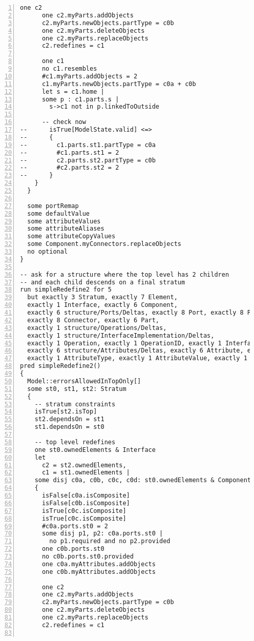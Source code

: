 \begin{lstlisting}[caption={unittests\_redefinition.als}, numbers=left]
      one c2
      one c2.myParts.addObjects
      c2.myParts.newObjects.partType = c0b
      one c2.myParts.deleteObjects
      one c2.myParts.replaceObjects
      c2.redefines = c1
      
      one c1
      no c1.resembles
      #c1.myParts.addObjects = 2
      c1.myParts.newObjects.partType = c0a + c0b
      let s = c1.home |
      some p : c1.parts.s |
        s->c1 not in p.linkedToOutside
      
      -- check now
--      isTrue[ModelState.valid] <=>
--      {
--        c1.parts.st1.partType = c0a
--        #c1.parts.st1 = 2
--        c2.parts.st2.partType = c0b
--        #c2.parts.st2 = 2
--      }
    }
  }

  some portRemap
  some defaultValue
  some attributeValues
  some attributeAliases
  some attributeCopyValues
  some Component.myConnectors.replaceObjects
  no optional
}

-- ask for a structure where the top level has 2 children
-- and each child descends on a final stratum
run simpleRedefine2 for 5
  but exactly 3 Stratum, exactly 7 Element,
  exactly 1 Interface, exactly 6 Component,
  exactly 6 structure/Ports/Deltas, exactly 8 Port, exactly 8 PortID,
  exactly 8 Connector, exactly 6 Part,
  exactly 1 structure/Operations/Deltas,
  exactly 1 structure/InterfaceImplementation/Deltas,
  exactly 1 Operation, exactly 1 OperationID, exactly 1 InterfaceImplementation,
  exactly 6 structure/Attributes/Deltas, exactly 6 Attribute, exactly 4 AttributeID,
  exactly 1 AttributeType, exactly 1 AttributeValue, exactly 1 ComponentImplementation, 16 ConnectorEnd
pred simpleRedefine2()
{
  Model::errorsAllowedInTopOnly[]
  some st0, st1, st2: Stratum
  {
    -- stratum constraints
    isTrue[st2.isTop]
    st2.dependsOn = st1
    st1.dependsOn = st0

    -- top level redefines
    one st0.ownedElements & Interface
    let
      c2 = st2.ownedElements,
      c1 = st1.ownedElements |
    some disj c0a, c0b, c0c, c0d: st0.ownedElements & Component
    {
      isFalse[c0a.isComposite]
      isFalse[c0b.isComposite]
      isTrue[c0c.isComposite]
      isTrue[c0c.isComposite]
      #c0a.ports.st0 = 2
      some disj p1, p2: c0a.ports.st0 |
        no p1.required and no p2.provided
      one c0b.ports.st0
      no c0b.ports.st0.provided
      one c0a.myAttributes.addObjects
      one c0b.myAttributes.addObjects
      
      one c2
      one c2.myParts.addObjects
      c2.myParts.newObjects.partType = c0b
      one c2.myParts.deleteObjects
      one c2.myParts.replaceObjects
      c2.redefines = c1
      

\end{lstlisting}
